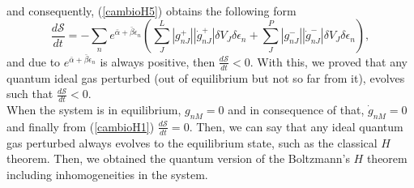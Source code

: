 \documentclass{article}
\newcommand{\de}{\delta}
\newcommand{\Ss}{\mathcal{S}}
\begin{document}
\\
and consequently, (\ref{cambioH5}) obtains the following form
\begin{equation}
    \frac{d\Ss}{dt}=-\sum_n  e^{\bar{\alpha}+\bar{\beta}\epsilon_n}\left(\sum_J ^{L} |g^{+}_{nJ}||\dot{g}^{+}_{nJ}|\de V_J \delta \epsilon_n+\sum^{P}_J  |g^{-}_{nJ}||\dot{g}^{-}_{nJ}| \de V_J \delta \epsilon_n \right), \label{cambioH6}
\end{equation}{}
and due to $e^{\bar{\alpha}+\bar{\beta}\epsilon_n}$ is always positive, then $\frac{d\Ss}{dt}<0$. With this, we proved that any quantum ideal gas perturbed (out of equilibrium but not so far from it), evolves such that $\frac{d\Ss}{dt}<0$.\\
When the system is in equilibrium, $g_{nM}=0$ and in consequence of that, $\dot g_{nM}=0$ and finally from (\ref{cambioH1}) $\frac{d\Ss}{dt}=0$. Then, we can say that any ideal quantum gas perturbed always evolves to the equilibrium state, such as the classical $H$ theorem. Then, we obtained the quantum version of the Boltzmann's $H$ theorem including inhomogeneities in the system.\\
  
  
\end{document}
